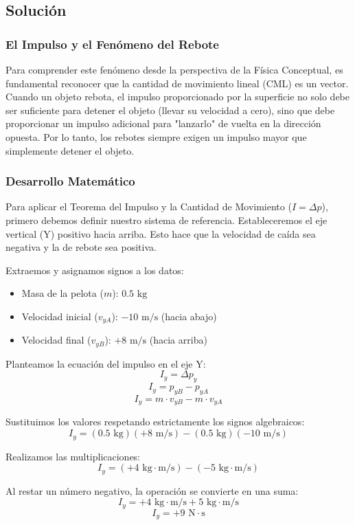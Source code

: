 \documentclass{article}
\begin{document}
\subsection*{Solución}

\subsubsection*{El Impulso y el Fenómeno del Rebote}
Para comprender este fenómeno desde la perspectiva de la Física Conceptual, es fundamental reconocer que la cantidad de movimiento lineal (CML) es un vector. Cuando un objeto rebota, el impulso proporcionado por la superficie no solo debe ser suficiente para detener el objeto (llevar su velocidad a cero), sino que debe proporcionar un impulso adicional para "lanzarlo" de vuelta en la dirección opuesta. Por lo tanto, los rebotes siempre exigen un impulso mayor que simplemente detener el objeto.

\subsubsection*{Desarrollo Matemático}
Para aplicar el Teorema del Impulso y la Cantidad de Movimiento ($I = \Delta p$), primero debemos definir nuestro sistema de referencia. Estableceremos el eje vertical (Y) positivo hacia arriba. Esto hace que la velocidad de caída sea negativa y la de rebote sea positiva.

Extraemos y asignamos signos a los datos:
\begin{itemize}
    \item Masa de la pelota ($m$): $0.5 \text{ kg}$
    \item Velocidad inicial ($v_{yA}$): $-10 \text{ m/s}$ (hacia abajo)
    \item Velocidad final ($v_{yB}$): $+8 \text{ m/s}$ (hacia arriba)
\end{itemize}

Planteamos la ecuación del impulso en el eje Y:
$$I_y = \Delta p_y$$
$$I_y = p_{yB} - p_{yA}$$
$$I_y = m \cdot v_{yB} - m \cdot v_{yA}$$

Sustituimos los valores respetando estrictamente los signos algebraicos:
$$I_y = (0.5 \text{ kg})(+8 \text{ m/s}) - (0.5 \text{ kg})(-10 \text{ m/s})$$

Realizamos las multiplicaciones:
$$I_y = (+4 \text{ kg}\cdot\text{m/s}) - (-5 \text{ kg}\cdot\text{m/s})$$

Al restar un número negativo, la operación se convierte en una suma:
$$I_y = +4 \text{ kg}\cdot\text{m/s} + 5 \text{ kg}\cdot\text{m/s}$$
$$I_y = +9 \text{ N}\cdot\text{s}$$
\end{document}
